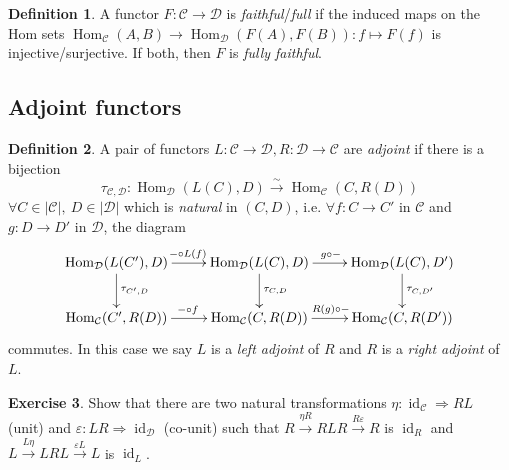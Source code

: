 \documentclass{article}
\newcommand{\id}{\operatorname{id}}
\newcommand{\Hom}{\operatorname{Hom}}
\newcommand{\ca}{\mathcal{C}}
\newcommand{\da}{\mathcal{D}}
\theoremstyle{definition}
\newtheorem{defn}{Definition}[subsection]
\newtheorem{exe}[defn]{Exercise}
\begin{document}
\begin{defn}
A functor $F:\ca\rightarrow\da$ is \textit{faithful}/\textit{full} if the induced maps on the Hom sets $\Hom_\ca(A,B)\rightarrow\Hom_\da(F(A),F(B)):f\mapsto F(f)$ is injective/surjective. If both, then $F$ is \textit{fully faithful}.
\end{defn}

\subsection{Adjoint functors}
\begin{defn}
A pair of functors $L:\ca\rightarrow\da,R:\da\rightarrow\ca$ are \textit{adjoint} if there is a bijection
\[
\tau_{\ca,\da}:\Hom_\da(L(C),D)\xrightarrow{\sim}\Hom_\ca(C,R(D))
\]
$\forall C\in|\ca|,\ D\in|\da|$ which is \textit{natural} in $(C,D)$, i.e. $\forall f:C\rightarrow C'$ in $\ca$ and $g:D\rightarrow D'$ in $\da$, the diagram
\[
\xymatrix{
\Hom_\da(L(C'),D)\ar[r]^{-\circ L(f)}\ar[d]^{\tau_{C',D}} & \Hom_\da(L(C),D)\ar[r]^{g\circ-}\ar[d]^{\tau_{C,D}} & \Hom_\da(L(C),D')\ar[d]^{\tau_{C,D'}} \\
\Hom_\ca(C',R(D))\ar[r]^{-\circ f} & \Hom_\ca(C,R(D))\ar[r]^{R(g)\circ-} & \Hom_\ca(C,R(D'))
}
\]
commutes. In this case we say $L$ is a \textit{left adjoint} of $R$ and $R$ is a \textit{right adjoint} of $L$.
\end{defn}

\begin{exe}
Show that there are two natural transformations $\eta:\id_\ca\Rightarrow RL$ (unit) and $\varepsilon:LR\Rightarrow\id_\da$ (co-unit) such that $R\xrightarrow{\eta R}RLR\xrightarrow{R\varepsilon}R$ is $\id_R$ and $L\xrightarrow{L\eta}LRL\xrightarrow{\varepsilon L}L$ is $\id_L$. 
\end{exe}
\end{document}
